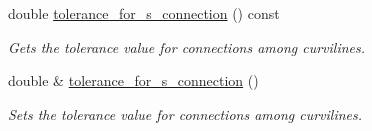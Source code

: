 \begin{DoxyCompactItemize}
double \hyperlink{classoomph_1_1TriangleMeshCurveSection_a353eb1cc152ccc922c92c584b0bbe1bc}{tolerance\+\_\+for\+\_\+s\+\_\+connection} () const
\begin{DoxyCompactList}\small\item\em Gets the tolerance value for connections among curvilines. \end{DoxyCompactList}\item 
double \& \hyperlink{classoomph_1_1TriangleMeshCurveSection_a32eb375e9044332d16ad44178b5c6b02}{tolerance\+\_\+for\+\_\+s\+\_\+connection} ()
\begin{DoxyCompactList}\small\item\em Sets the tolerance value for connections among curvilines. \end{DoxyCompactList}\end{DoxyCompactItemize}
